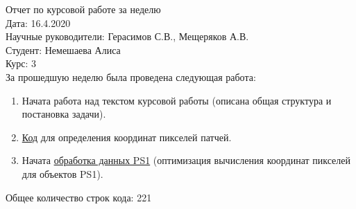 \documentclass{article}
\begin{document}
Отчет по курсовой работе за неделю\\
Дата: 16.4.2020\\
Научные руководители: Герасимов С.В., Мещеряков А.В.\\
Студент: Немешаева Алиса\\
Курс: 3\\

\renewcommand{\labelitemi}{$\blacksquare$}
\renewcommand\labelitemii{$\square$}
За прошедшую неделю была проведена следующая работа:\\
\begin{enumerate}
    \item Начата работа над текстом курсовой работы (описана общая структура и постановка задачи).\\
    \item \href{https://github.com/rt2122/data-segmentation/blob/master/old/healpy/make_pic_proper.ipynb}
        {Код} для определения координат пикселей патчей.\\
    \item Начата \href{https://github.com/rt2122/data-segmentation/blob/master/rk/calc_npix.ipynb}
        {обработка данных PS1} (оптимизация вычисления координат пикселей для объектов PS1).\\
\end{enumerate}

Общее количество строк кода: 221\\
\end{document}
